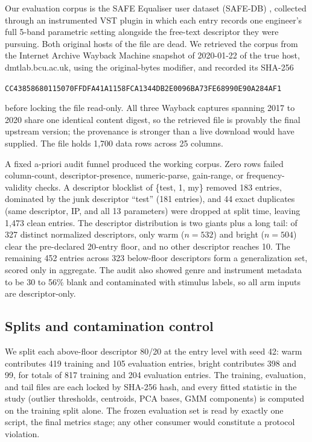 \documentclass[11pt]{article}
\begin{document}
Our evaluation corpus is the SAFE Equaliser user dataset (SAFE-DB) \cite{stables2014safe}, collected through an instrumented VST plugin in which each entry records one engineer's full 5-band parametric setting alongside the free-text descriptor they were pursuing. Both original hosts of the file are dead. We retrieved the corpus from the Internet Archive Wayback Machine snapshot of 2020-01-22 of the true host, dmtlab.bcu.ac.uk, using the original-bytes modifier, and recorded its SHA-256
\begin{center}
\small\texttt{CC43858680115070FFDFA41A1158FCA1344DB2E0096BA73FE68990E90A284AF1}
\end{center}
before locking the file read-only. All three Wayback captures spanning 2017 to 2020 share one identical content digest, so the retrieved file is provably the final upstream version; the provenance is stronger than a live download would have supplied. The file holds 1,700 data rows across 25 columns.

A fixed a-priori audit funnel produced the working corpus. Zero rows failed column-count, descriptor-presence, numeric-parse, gain-range, or frequency-validity checks. A descriptor blocklist of \{test, 1, my\} removed 183 entries, dominated by the junk descriptor ``test'' (181 entries), and 44 exact duplicates (same descriptor, IP, and all 13 parameters) were dropped at split time, leaving 1,473 clean entries. The descriptor distribution is two giants plus a long tail: of 327 distinct normalized descriptors, only warm ($n=532$) and bright ($n=504$) clear the pre-declared 20-entry floor, and no other descriptor reaches 10. The remaining 452 entries across 323 below-floor descriptors form a generalization set, scored only in aggregate. The audit also showed genre and instrument metadata to be 30 to 56\% blank and contaminated with stimulus labels, so all arm inputs are descriptor-only.

\subsection{Splits and contamination control}

We split each above-floor descriptor 80/20 at the entry level with seed 42: warm contributes 419 training and 105 evaluation entries, bright contributes 398 and 99, for totals of 817 training and 204 evaluation entries. The training, evaluation, and tail files are each locked by SHA-256 hash, and every fitted statistic in the study (outlier thresholds, centroids, PCA bases, GMM components) is computed on the training split alone. The frozen evaluation set is read by exactly one script, the final metrics stage; any other consumer would constitute a protocol violation.
\end{document}
